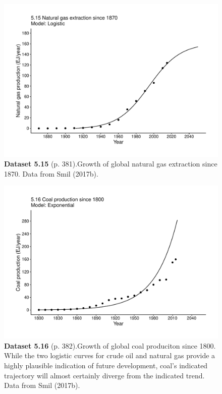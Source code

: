 \documentclass[aps,rmp,preprint,superscriptaddress,10pt,onecolumn]{article}
\begin{document}
\clearpage
\begin{figure}[h]
\includegraphics[width=\textwidth]{output/figs-ggplot/5.15.pdf}
\caption*{\textbf{Dataset 5.15} (p. 381).Growth of global natural gas extraction since 1870. Data from Smil (2017b).}
\end{figure}
	
\clearpage
\begin{figure}[h]
\includegraphics[width=\textwidth]{output/figs-ggplot/5.16.pdf}
\caption*{\textbf{Dataset 5.16} (p. 382).Growth of global coal produciton since 1800. While the two logistic curves for crude oil and natural gas provide a highly plausible indication of future development, coal's indicated trajectory will almost certainly diverge from the indicated trend. Data from Smil (2017b). }
\end{figure}
	
\end{document}
